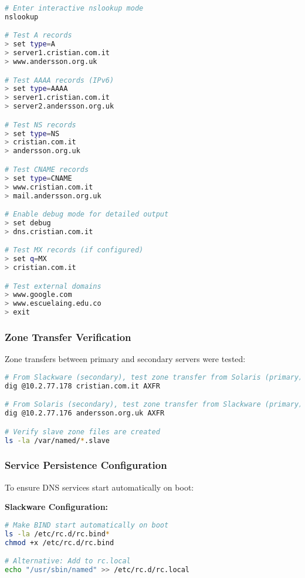 \documentclass[12pt,a4paper]{article}
\begin{document}
\begin{lstlisting}[language=bash, caption=Advanced nslookup Commands]
# Enter interactive nslookup mode
nslookup

# Test A records
> set type=A
> server1.cristian.com.it
> www.andersson.org.uk

# Test AAAA records (IPv6)
> set type=AAAA
> server1.cristian.com.it
> server2.andersson.org.uk

# Test NS records
> set type=NS
> cristian.com.it
> andersson.org.uk

# Test CNAME records
> set type=CNAME
> www.cristian.com.it
> mail.andersson.org.uk

# Enable debug mode for detailed output
> set debug
> dns.cristian.com.it

# Test MX records (if configured)
> set q=MX
> cristian.com.it

# Test external domains
> www.google.com
> www.escuelaing.edu.co
> exit
\end{lstlisting}

\subsubsection{Zone Transfer Verification}
Zone transfers between primary and secondary servers were tested:

\begin{lstlisting}[language=bash, caption=Zone Transfer Testing]
# From Slackware (secondary), test zone transfer from Solaris (primary)
dig @10.2.77.178 cristian.com.it AXFR

# From Solaris (secondary), test zone transfer from Slackware (primary)
dig @10.2.77.176 andersson.org.uk AXFR

# Verify slave zone files are created
ls -la /var/named/*.slave
\end{lstlisting}

\subsubsection{Service Persistence Configuration}
To ensure DNS services start automatically on boot:

\textbf{Slackware Configuration:}
\begin{lstlisting}[language=bash, caption=Slackware Service Persistence]
# Make BIND start automatically on boot
ls -la /etc/rc.d/rc.bind*
chmod +x /etc/rc.d/rc.bind

# Alternative: Add to rc.local
echo "/usr/sbin/named" >> /etc/rc.d/rc.local
\end{lstlisting}
\end{document}
